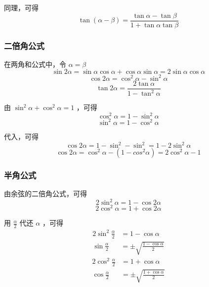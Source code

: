同理，可得
\begin{equation}
\tan(\alpha-\beta) = \frac{\tan\alpha - \tan\beta}{1 + \tan\alpha\tan\beta}
\end{equation}

\subsubsection{二倍角公式}
在两角和公式中，令 $\alpha = \beta$
\begin{equation}
\sin2\alpha = \sin\alpha \cos\alpha+\cos\alpha \sin\alpha = 2\sin\alpha \cos\alpha
\end{equation}
\begin{equation}
\cos2\alpha = \cos^2\alpha - \sin^2\alpha
\end{equation}
\begin{equation}
\tan2\alpha = \frac{2\tan\alpha}{1 - \tan^2\alpha}
\end{equation}

由 $\sin^2\alpha + \cos^2\alpha = 1$ ，可得
\begin{equation}
\cos^2\alpha = 1 - \sin^2\alpha
\end{equation}
\begin{equation}
\sin^2\alpha = 1 - \cos^2\alpha
\end{equation}

代入，可得
\begin{equation}
\cos2\alpha = 1 - \sin^2 - \sin^2 = 1 - 2\sin^2\alpha
\end{equation}
\begin{equation}
\cos2\alpha = \cos^2\alpha - (1 - cos^2\alpha) = 2\cos^2\alpha - 1
\end{equation}

\subsubsection{半角公式}
由余弦的二倍角公式，可得
\begin{equation}
2\sin^2\alpha = 1 - \cos2\alpha
\end{equation}
\begin{equation}
2\cos^2\alpha = 1 + \cos2\alpha
\end{equation}

用 $\frac{\alpha}{2}$ 代还 $\alpha$ ，可得
\begin{equation}
\begin{aligned}
2\sin^2\frac{\alpha}{2} &= 1 - \cos\alpha\\
\sin\frac{\alpha}{2}&= \pm\sqrt{\frac{1-\cos\alpha}{2}}
\end{aligned}
\end{equation}
\begin{equation}
\begin{aligned}
2\cos^2\frac{\alpha}{2} &= 1 + \cos\alpha\\
\cos\frac{\alpha}{2} &= \pm\sqrt{\frac{1+\cos\alpha}{2}}
\end{aligned}
\end{equation}
